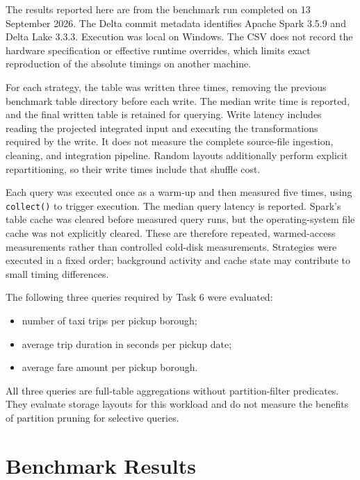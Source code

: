 \documentclass[a4paper,11pt]{article}
\begin{document}
The results reported here are from the benchmark run completed on 13 September 2026. The Delta commit metadata identifies Apache Spark 3.5.9 and Delta Lake 3.3.3. Execution was local on Windows. The CSV does not record the hardware specification or effective runtime overrides, which limits exact reproduction of the absolute timings on another machine.

For each strategy, the table was written three times, removing the previous benchmark table directory before each write. The median write time is reported, and the final written table is retained for querying. Write latency includes reading the projected integrated input and executing the transformations required by the write. It does not measure the complete source-file ingestion, cleaning, and integration pipeline. Random layouts additionally perform explicit repartitioning, so their write times include that shuffle cost.

Each query was executed once as a warm-up and then measured five times, using \texttt{collect()} to trigger execution. The median query latency is reported. Spark's table cache was cleared before measured query runs, but the operating-system file cache was not explicitly cleared. These are therefore repeated, warmed-access measurements rather than controlled cold-disk measurements. Strategies were executed in a fixed order; background activity and cache state may contribute to small timing differences.

The following three queries required by Task 6 were evaluated:

\begin{itemize}
    \item number of taxi trips per pickup borough;
    \item average trip duration in seconds per pickup date;
    \item average fare amount per pickup borough.
\end{itemize}

All three queries are full-table aggregations without partition-filter predicates. They evaluate storage layouts for this workload and do not measure the benefits of partition pruning for selective queries.

\section{Benchmark Results}
\end{document}
